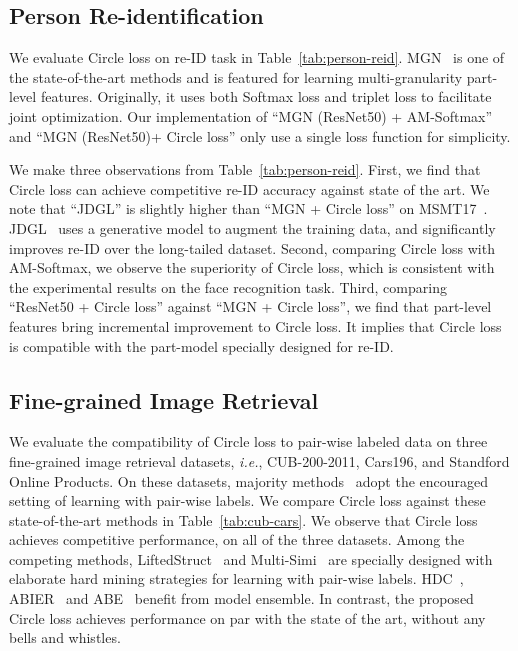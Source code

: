 \documentclass[10pt,twocolumn,letterpaper]{article}
\begin{document}
\subsection{Person Re-identification}\label{sec:exp_reid}

We evaluate Circle loss on re-ID task in Table~\ref{tab:person-reid}. MGN~\cite{Wang_2018MGN} is one of the state-of-the-art methods and is featured for learning multi-granularity part-level features. Originally, it uses both Softmax loss and triplet loss to facilitate joint optimization. Our implementation of ``MGN (ResNet50) + AM-Softmax'' and ``MGN (ResNet50)+ Circle loss'' only use a single loss function for simplicity. 

We make three observations from Table~\ref{tab:person-reid}. First, we find that Circle loss can achieve competitive re-ID accuracy against state of the art. We note that ``JDGL'' is slightly higher than ``MGN + Circle loss'' on MSMT17~\cite{Wei_2018_CVPRMSMT17}. JDGL~\cite{Zheng_2019_CVPRJDGL} uses a generative model to augment the training data, and significantly improves re-ID over the long-tailed dataset. Second, comparing Circle loss with AM-Softmax, we observe the superiority of Circle loss, which is consistent with the experimental results on the face recognition task. Third, comparing ``ResNet50 + Circle loss'' against ``MGN + Circle loss'', we find that part-level features bring incremental improvement to Circle loss. It implies that Circle loss is compatible with the part-model specially designed for re-ID. 



\subsection{Fine-grained Image Retrieval}\label{sec:exp_finegrain}
\vspace{0.5em}
We evaluate the compatibility of Circle loss to pair-wise labeled data on three fine-grained image retrieval datasets, \emph{i.e.}, CUB-200-2011, Cars196, and Standford Online Products. On these datasets, majority methods~\cite{oh2016deep,Song_2017_CVPRHDC,Ge_2018_ECCVHTL,ABIER,Kim_2018_ECCVABE,wang2019multi} adopt the encouraged setting of learning with pair-wise labels. We compare Circle loss against these state-of-the-art methods in Table~\ref{tab:cub-cars}. We observe that Circle loss achieves competitive performance, on all of the three datasets. Among the competing methods, LiftedStruct~\cite{oh2016deep} and Multi-Simi~\cite{wang2019multi} are specially designed with elaborate hard mining strategies for learning with pair-wise labels. HDC~\cite{Song_2017_CVPRHDC}, ABIER~\cite{ABIER} and ABE~\cite{Kim_2018_ECCVABE} benefit from model ensemble. In contrast, the proposed Circle loss achieves performance on par with the state of the art, without any bells and whistles. 
\end{document}
